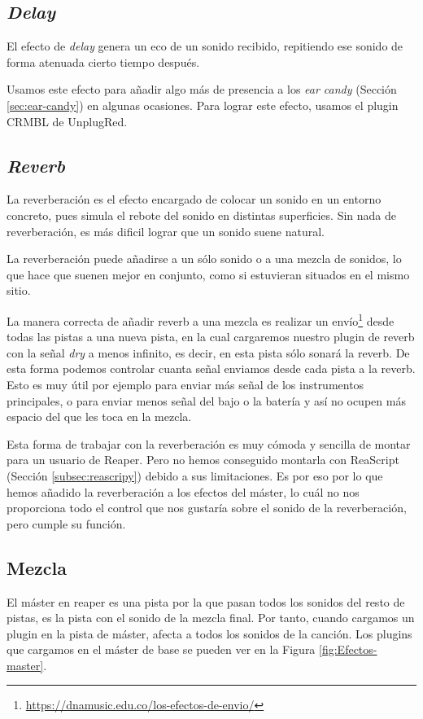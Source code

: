     \subsection{\textit{Delay}}\label{subsubsec:delay}
El efecto de \textit{delay} genera un eco de un sonido recibido, repitiendo ese sonido de forma atenuada cierto tiempo después. 

Usamos este efecto para añadir algo más de presencia a los \textit{ear candy} (Sección \ref{sec:ear-candy}) en algunas ocasiones. Para lograr este efecto, usamos el plugin CRMBL de UnplugRed.

    \subsection{\textit{Reverb}}\label{subsubsec:reverb}
La reverberación es el efecto encargado de colocar un sonido en un entorno concreto, pues simula el rebote del sonido en distintas superficies. Sin nada de reverberación, es más dificil lograr que un sonido suene natural.

La reverberación puede añadirse a un sólo sonido o a una mezcla de sonidos, lo que hace que suenen mejor en conjunto, como si estuvieran situados en el mismo sitio.

La manera correcta de añadir reverb a una mezcla es realizar un envío\footnote{\url{https://dnamusic.edu.co/los-efectos-de-envio/}} desde todas las pistas a una nueva pista, en la cual cargaremos nuestro plugin de reverb con la señal \textit{dry} a menos infinito, es decir, en esta pista sólo sonará la reverb. De esta forma podemos controlar cuanta señal enviamos desde cada pista a la reverb. Esto es muy útil por ejemplo para enviar más señal de los instrumentos principales, o para enviar menos señal del bajo o la batería y así no ocupen más espacio del que les toca en la mezcla.

Esta forma de trabajar con la reverberación es muy cómoda y sencilla de montar para un usuario de Reaper. Pero no hemos conseguido montarla con ReaScript (Sección \ref{subsec:reascripy}) debido a sus limitaciones. Es por eso por lo que hemos añadido la reverberación a los efectos del máster, lo cuál no nos proporciona todo el control que nos gustaría sobre el sonido de la reverberación, pero cumple su función.

    \subsection{Mezcla}
El máster en reaper es una pista por la que pasan todos los sonidos del resto de pistas, es la pista con el sonido de la mezcla final. Por tanto, cuando cargamos un plugin en la pista de máster, afecta a todos los sonidos de la canción. Los plugins que cargamos en el máster de base se pueden ver en la Figura \ref{fig:Efectos-master}.
    
